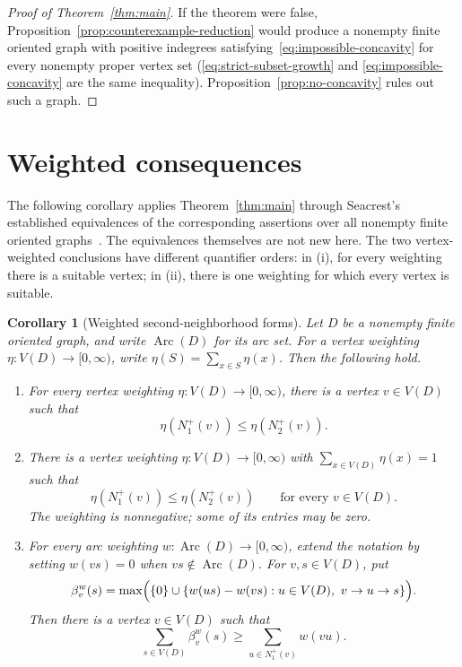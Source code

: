 \documentclass[11pt]{article}
\newtheorem{corollary}[theorem]{Corollary}
\theoremstyle{remark}
\DeclareMathOperator{\Arc}{Arc}
\begin{document}
\begin{proof}[Proof of Theorem~\ref{thm:main}]
If the theorem were false, Proposition~\ref{prop:counterexample-reduction}
would produce a nonempty finite oriented graph with positive indegrees
satisfying~\eqref{eq:impossible-concavity} for every nonempty proper vertex
set (\eqref{eq:strict-subset-growth} and \eqref{eq:impossible-concavity}
are the same inequality). Proposition~\ref{prop:no-concavity} rules out
such a graph.
\end{proof}

\section{Weighted consequences}\label{sec:weighted-consequences}

The following corollary applies Theorem~\ref{thm:main} through Seacrest's
established equivalences of the corresponding assertions over all nonempty
finite oriented graphs~\cite{Seacrest2015}. The equivalences themselves are
not new here. The two vertex-weighted conclusions have different quantifier
orders: in (i), for every weighting there is a suitable vertex; in (ii),
there is one weighting for which every vertex is suitable.

\begin{corollary}[Weighted second-neighborhood forms]\label{cor:weighted-forms}
Let \(D\) be a nonempty finite oriented graph, and write \(\Arc(D)\) for its
arc set. For a vertex weighting \(\eta:V(D)\to[0,\infty)\), write
\(\eta(S)=\sum_{x\in S}\eta(x)\). Then the following hold.
\begin{enumerate}[label=\textup{(\roman*)}]
\item For every vertex weighting \(\eta:V(D)\to[0,\infty)\), there is a
vertex \(v\in V(D)\) such that
\[
 \eta(N_1^+(v))\leq\eta(N_2^+(v)).
\]

\item There is a vertex weighting \(\eta:V(D)\to[0,\infty)\) with
\(\sum_{x\in V(D)}\eta(x)=1\) such that
\[
 \eta(N_1^+(v))\leq\eta(N_2^+(v))\qquad\text{for every }v\in V(D).
\]
The weighting is nonnegative; some of its entries may be zero.

\item For every arc weighting \(w:\Arc(D)\to[0,\infty)\), extend the notation
by setting \(w(vs)=0\) when \(vs\notin \Arc(D)\). For \(v,s\in V(D)\), put
\[
 \beta_v^w(s)=\max\Bigl(\{0\}\cup
 \{w(us)-w(vs):u\in V(D),\ v\to u\to s\}\Bigr).
\]
Then there is a vertex \(v\in V(D)\) such that
\[
 \sum_{s\in V(D)}\beta_v^w(s)
 \geq \sum_{u\in N_1^+(v)}w(vu).
\]
\end{enumerate}
\end{corollary}
\end{document}

